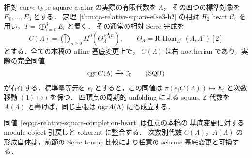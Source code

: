 \begin{theorem}[square完成の相対標識付きtails認識]
\label{thm:qa-relative-square-completion-tails}
相対 curve-type square avatar の実際の有限代数を $\Lambda$，
その四つの標準対象を $E_0,\ldots,E_3$ とする．
定理~\ref{thm:qa-relative-square-e0-e3-h2} の相対 $H_2$ heart
$\mathcal C_0$ を用い，$T=\bigoplus_{i=0}^3E_i$ と置く．
その通常の相対 Serre 完成を
\[
 C(\Lambda)=\bigoplus_{n\geq0}
 H^0(\Theta_\Lambda^{\otimes_\Lambda^{\mathbf L}n}),
 \qquad
 \Theta_\Lambda=\mathbf R\operatorname{Hom}_{\Lambda^e}
                      (\Lambda,\Lambda^e)[2]
\]
とする．全ての本稿の affine 基底変更上で，
$C(\Lambda)$ は右 noetherian であり，実際の完全同値
\[
 \operatorname{qgr} C(\Lambda)\xrightarrow{\sim}\mathcal C_0
 \tag{SQH}\label{eq:qa-relative-square-completion-heart}
\]
が存在する．標準冪等元を $e_i$ とすると，この同値は
$\pi(e_iC(\Lambda))\mapsto E_i$ と次数移動 $(1)\mapsto t$ を保つ．
四頂点の周期的 unfolding による square $\mathbb Z$-代数を
$A(\Lambda)$ と書けば，同じ主張は $\operatorname{qgr} A(\Lambda)$ にも成立する．

同値~\eqref{eq:qa-relative-square-completion-heart} は任意の本稿の
基底変更に対する module-object 引戻しと coherent に整合する．
次数別代数 $C(\Lambda)$，$A(\Lambda)$ の形成自体は，前節の
Serre tensor 比較により任意の scheme 基底変更と可換する．
\end{theorem}
